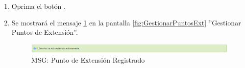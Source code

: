 \begin{enumerate}
			\item Oprima el botón \IUAceptar.
			
			\item Se mostrará el mensaje \ref{fig:pextRegistrado} en la pantalla \ref{fig:GestionarPuntosExt} ''Gestionar Puntos de Extensión''.
			
			\begin{figure}[htbp!]
				\begin{center}
					\includegraphics[scale=0.5]{roles/lider/glosario/pantallas/IU6-1MSG1}
					\caption{MSG: Punto de Extensión Registrado}
					\label{fig:pextRegistrado}
				\end{center}
			\end{figure}
			\end{enumerate}